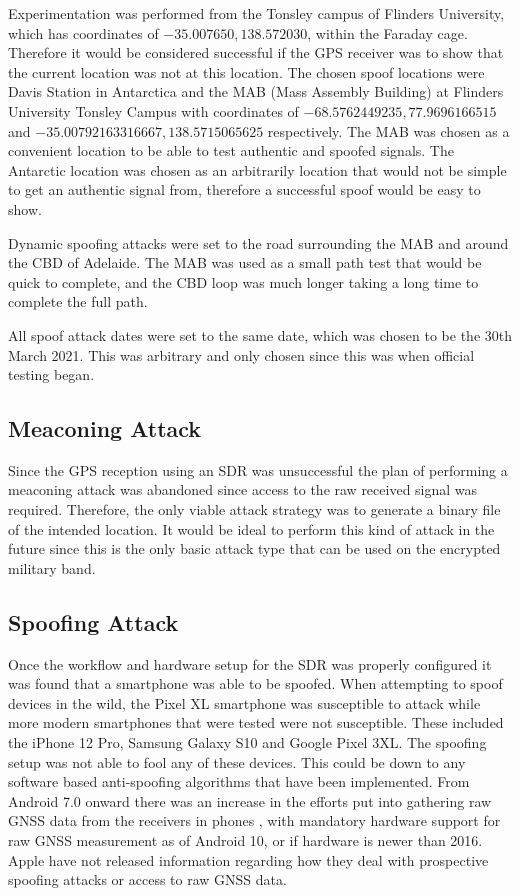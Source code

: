 Experimentation was performed from the Tonsley campus of Flinders University, which has coordinates of $-35.007650, 138.572030$, within the Faraday cage. Therefore it would
be considered successful if the GPS receiver was to show that the current location was not at this location. The chosen spoof locations were Davis Station in
Antarctica and the MAB (Mass Assembly Building) at Flinders University Tonsley Campus with coordinates of $-68.5762449235, 77.9696166515$ and $-35.00792163316667, 138.5715065625$ respectively.
The MAB was chosen as a convenient location to be able to test authentic and spoofed signals. The Antarctic location was chosen as an arbitrarily location that would
not be simple to get an authentic signal from, therefore a successful spoof would be easy to show.

Dynamic spoofing attacks were set to the road surrounding the MAB and around the CBD of Adelaide. The MAB was used as a small path test that would be quick to complete,
and the CBD loop was much longer taking a long time to complete the full path.


All spoof attack dates were set to the same date, which was chosen to be
the 30th March 2021. This was arbitrary and only chosen since this was when official testing began.

\subsection{Meaconing Attack}
Since the GPS reception using an SDR was unsuccessful the plan of performing a meaconing attack was abandoned since access to the raw received signal was required.
Therefore, the only viable attack strategy was to generate a binary file of the intended location. It would be ideal to perform this kind of attack in the future since
this is the only basic attack type that can be used on the encrypted military band.

\subsection{Spoofing Attack}
Once the workflow and hardware setup for the SDR was properly configured it was found that a smartphone was able to be spoofed.
When attempting to spoof devices in the wild, the Pixel XL smartphone was susceptible to attack while more modern smartphones that were tested were not susceptible. These
included the iPhone 12 Pro, Samsung Galaxy S10 and Google Pixel 3XL. The spoofing setup was not able to fool any of these devices. This could be down to any software based
anti-spoofing algorithms that have been implemented. From Android 7.0 onward there was an increase in the efforts put into gathering raw GNSS data from the
receivers in phones \cite{RN31}, with mandatory hardware support for raw GNSS measurement as of Android 10, or if hardware is newer than 2016.
Apple have not released information regarding how they deal with prospective spoofing attacks or access to raw GNSS data.

